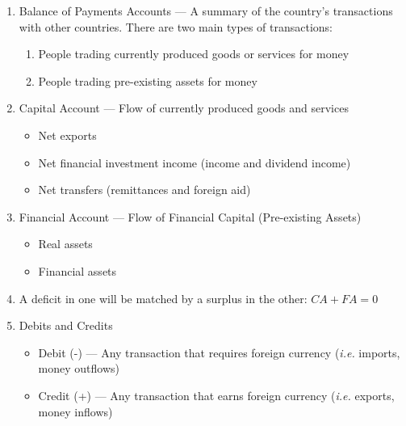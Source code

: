 \documentclass[12pt]{article}
\begin{document}
\begin{enumerate}
  \item Balance of Payments Accounts — A summary of the country's transactions with other countries. There are two main types of transactions:

    \begin{enumerate}

      \item People trading currently produced goods or services for money

      \item People trading pre-existing assets for money

    \end{enumerate}

  \item Capital Account — Flow of currently produced goods and services

    \begin{itemize}

      \item Net exports

      \item Net financial investment income (income and dividend income)

      \item Net transfers (remittances and foreign aid)

    \end{itemize}

  \item Financial Account — Flow of Financial Capital (Pre-existing Assets)

    \begin{itemize}

      \item Real assets

      \item Financial assets

    \end{itemize}

  \item A deficit in one will be matched by a surplus in the other: $CA + FA = 0$

  \item Debits and Credits

    \begin{itemize}

      \item Debit (-) — Any transaction that requires foreign currency (\textit{i.e.} imports, money outflows)

      \item Credit (+) — Any transaction that earns foreign currency (\textit{i.e.} exports, money inflows)

    \end{itemize}

\end{enumerate}
\end{document}
